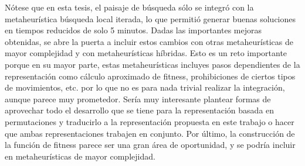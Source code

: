 Nótese que en esta tesis, el paisaje de búsqueda sólo se integró con la metaheurística búsqueda local iterada, lo que permitió generar buenas soluciones en 
tiempos reducidos de solo 5 minutos.
%
Dadas las importantes mejoras obtenidas, se abre la puerta a incluir estos cambios con otras metaheurísticas de mayor complejidad y con metaheurísticas híbridas. 
%
Esto es un reto importante porque en su mayor parte, estas metaheurísticas incluyes pasos dependientes de la representación como cálculo aproximado de fitness, 
prohibiciones de ciertos tipos de movimientos, etc. por lo que no es para nada trivial realizar la integración, aunque parece muy prometedor.
%
Sería muy interesante plantear formas de aprovechar todo el desarrollo que se tiene para la representación basada en permutaciones y traducirlo a la representación 
propuesta en este trabajo o hacer que ambas representaciones trabajen en conjunto. 
%
Por último, la construcción de la función de fitness parece ser una gran área de oportunidad, y se podría incluir en metaheurísticas de mayor complejidad. 
